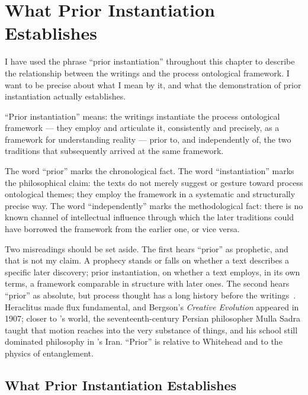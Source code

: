 \section{What Prior Instantiation Establishes}
\label{sec:ch6-what-it-establishes}

I have used the phrase ``prior instantiation'' throughout this chapter to describe
the relationship between the \bahai writings and the process ontological framework.
I want to be precise about what I mean by it, and what the demonstration of prior
instantiation actually establishes.

``Prior instantiation'' means: the \bahai writings instantiate the process
ontological framework --- they employ and articulate it, consistently and precisely,
as a framework for understanding reality --- prior to, and independently of, the
two traditions that subsequently arrived at the same framework.

The word ``prior'' marks the chronological fact.
The word ``instantiation'' marks the philosophical claim: the texts do not merely
suggest or gesture toward process ontological themes; they employ the framework
in a systematic and structurally precise way.
The word ``independently'' marks the methodological fact: there is no known channel
of intellectual influence through which the later traditions could have borrowed
the framework from the earlier one, or vice versa.

Two misreadings should be set aside.
The first hears ``prior'' as prophetic, and that is not my claim.
A prophecy stands or falls on whether a text describes a specific later
discovery; prior instantiation, on whether a text employs, in its own terms, a
framework comparable in structure with later ones.
The second hears ``prior'' as absolute, but process thought has a long history
before the \bahai writings~\citep{Rescher1996}.
Heraclitus made flux fundamental, and Bergson's \textit{Creative Evolution}
appeared in 1907; closer to \Bahaullah's world, the
seventeenth-century Persian philosopher Mulla Sadra taught that motion reaches
into the very substance of things, and his school still dominated philosophy in
\Bahaullah's Iran.
``Prior'' is relative to Whitehead and to the physics of entanglement.

\subsection*{What Prior Instantiation Establishes}

